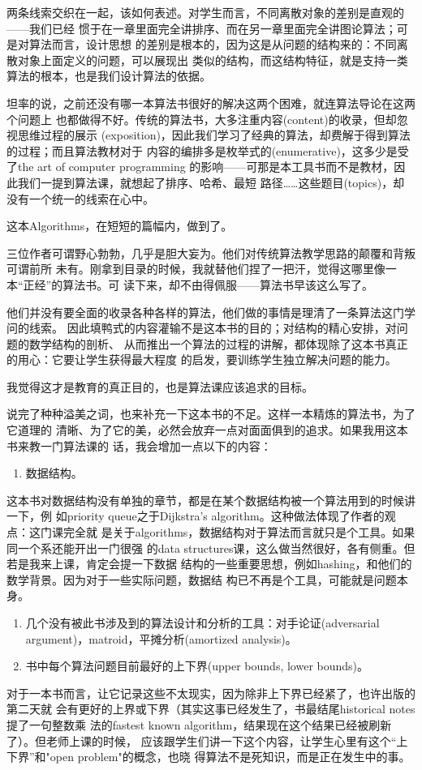 \documentclass[11pt]{article}
\begin{document}
两条线索交织在一起，该如何表述。对学生而言，不同离散对象的差别是直观的——我们已经
惯于在一章里面完全讲排序、而在另一章里面完全讲图论算法；可是对算法而言，设计思想
的差别是根本的，因为这是从问题的结构来的：不同离散对象上面定义的问题，可以展现出
类似的结构，而这结构特征，就是支持一类算法的根本，也是我们设计算法的依据。


坦率的说，之前还没有哪一本算法书很好的解决这两个困难，就连算法导论在这两个问题上
也都做得不好。传统的算法书，大多注重内容(content)的收录，但却忽视思维过程的展示
(exposition)，因此我们学习了经典的算法，却费解于得到算法的过程；而且算法教材对于
内容的编排多是枚举式的(enumerative)，这多少是受了the art of computer programming
的影响——可那是本工具书而不是教材，因此我们一提到算法课，就想起了排序、哈希、最短
路径……这些题目(topics)，却没有一个统一的线索在心中。

这本Algorithms，在短短的篇幅内，做到了。

三位作者可谓野心勃勃，几乎是胆大妄为。他们对传统算法教学思路的颠覆和背叛可谓前所
未有。刚拿到目录的时候，我就替他们捏了一把汗，觉得这哪里像一本“正经”的算法书。可
读下来，却不由得佩服——算法书早该这么写了。

他们并没有要全面的收录各种各样的算法，他们做的事情是理清了一条算法这门学问的线索。
因此填鸭式的内容灌输不是这本书的目的；对结构的精心安排，对问题的数学结构的剖析、
从而推出一个算法的过程的讲解，都体现除了这本书真正的用心：它要让学生获得最大程度
的启发，要训练学生独立解决问题的能力。

我觉得这才是教育的真正目的，也是算法课应该追求的目标。


说完了种种溢美之词，也来补充一下这本书的不足。这样一本精炼的算法书，为了它道理的
清晰、为了它的美，必然会放弃一点对面面俱到的追求。如果我用这本书来教一门算法课的
话，我会增加一点以下的内容：

\begin{enumerate}
\item 数据结构。
\end{enumerate}
这本书对数据结构没有单独的章节，都是在某个数据结构被一个算法用到的时候讲一下，例
如priority queue之于Dijkstra's algorithm。这种做法体现了作者的观点：这门课完全就
是关于algorithms，数据结构对于算法而言就只是个工具。如果同一个系还能开出一门很强
的data structures课，这么做当然很好，各有侧重。但若是我来上课，肯定会提一下数据
结构的一些重要思想，例如hashing，和他们的数学背景。因为对于一些实际问题，数据结
构已不再是个工具，可能就是问题本身。

\begin{enumerate}
\item 几个没有被此书涉及到的算法设计和分析的工具：对手论证(adversarial argument)，matroid，平摊分析(amortized analysis)。

\item 书中每个算法问题目前最好的上下界(upper bounds, lower bounds)。
\end{enumerate}
对于一本书而言，让它记录这些不太现实，因为除非上下界已经紧了，也许出版的第二天就
会有更好的上界或下界（其实这事已经发生了，书最结尾historical notes提了一句整数乘
法的fastest known algorithm，结果现在这个结果已经被刷新了）。但老师上课的时候，
应该跟学生们讲一下这个内容，让学生心里有这个“上下界”和"open problem"的概念，也晓
得算法不是死知识，而是正在发生中的事。
\end{document}
